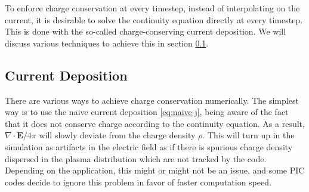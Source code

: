 To enforce charge conservation at every timestep, instead of interpolating on
the current, it is desirable to solve the continuity equation directly at every
timestep. This is done with the so-called charge-conserving current deposition.
We will discuss various techniques to achieve this in section
\ref{sec:charge-cons-curr}.




\subsection{Current Deposition}
\label{sec:charge-cons-curr}

There are various ways to achieve charge conservation numerically. The simplest
way is to use the naive current deposition \eqref{eq:naive-j}, being aware of
the fact that it does not conserve charge according to the continuity equation.
As a result, $\nabla\cdot \mathbf{E}/4\pi$ will slowly deviate from the charge
density $\rho$. This will turn up in the simulation as artifacts in the electric
field as if there is spurious charge density dispersed in the plasma
distribution which are not tracked by the code. Depending on the application,
this might or might not be an issue, and some PIC codes decide to ignore this
problem in favor of faster computation speed.

